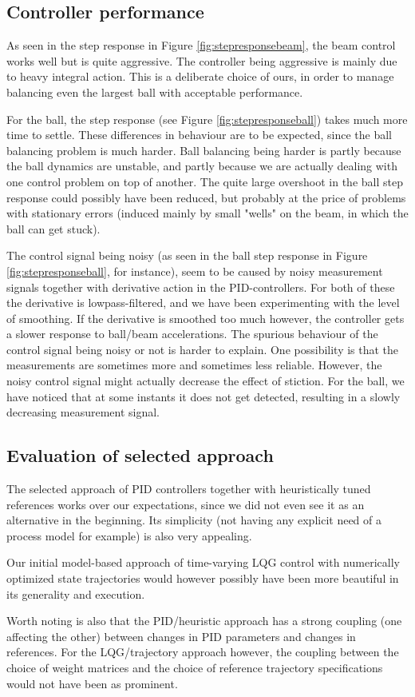 
\subsection{Controller performance}
As seen in the step response in Figure \ref{fig:stepresponsebeam}, the beam control works well but is quite aggressive.
The controller being aggressive is mainly due to heavy integral action.
This is a deliberate choice of ours, in order to manage balancing even the largest ball with acceptable performance.

For the ball, the step response (see Figure \ref{fig:stepresponseball}) takes much more time to settle.
These differences in behaviour are to be expected, since the ball balancing problem is much harder.
Ball balancing being harder is partly because the ball dynamics are unstable, and partly because we are actually dealing with one control problem on top of another.
The quite large overshoot in the ball step response could possibly have been reduced, but probably at the price of problems with stationary errors (induced mainly by small "wells" on the beam, in which the ball can get stuck).

The control signal being noisy (as seen in the ball step response in Figure \ref{fig:stepresponseball}, for instance), seem to be caused by noisy measurement signals together with derivative action in the PID-controllers.
For both of these the derivative is lowpass-filtered, and we have been experimenting with the level of smoothing. If the derivative is smoothed too much however, the controller gets a slower response to ball/beam accelerations.
The spurious behaviour of the control signal being noisy or not is harder to explain.
One possibility is that the measurements are sometimes more and sometimes less reliable.
However, the noisy control signal might actually decrease the effect of stiction.
For the ball, we have noticed that at some instants it does not get detected, resulting in a slowly decreasing measurement signal.

\subsection{Evaluation of selected approach}
The selected approach of PID controllers together with heuristically tuned references works over our expectations, since we did not even see it as an alternative in the beginning. Its simplicity (not having any explicit need of a process model for example) is also very appealing.

Our initial model-based approach of time-varying LQG control with numerically optimized state trajectories would however possibly have been more beautiful in its generality and execution.

Worth noting is also that the PID/heuristic approach has a strong coupling (one affecting the other) between changes in PID parameters and changes in references. For the LQG/trajectory approach however, the coupling between the choice of weight matrices and the choice of reference trajectory specifications would not have been as prominent.


